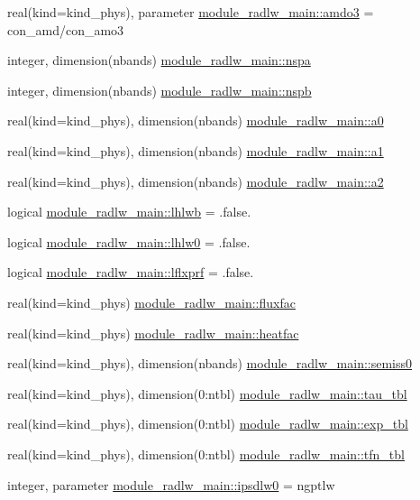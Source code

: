 \begin{DoxyCompactItemize}
\item 
real(kind=kind\+\_\+phys), parameter \hyperlink{group__module__radlw__main_ga06f62c34722a3d7dcec9b5643d78f039}{module\+\_\+radlw\+\_\+main\+::amdo3} = con\+\_\+amd/con\+\_\+amo3
\item 
integer, dimension(nbands) \hyperlink{group__module__radlw__main_ga42bbf62b5d91586f17d352af74e3c032}{module\+\_\+radlw\+\_\+main\+::nspa}
\item 
integer, dimension(nbands) \hyperlink{group__module__radlw__main_ga520be8a7f308d9e2c8e88b185170404e}{module\+\_\+radlw\+\_\+main\+::nspb}
\item 
real(kind=kind\+\_\+phys), dimension(nbands) \hyperlink{group__module__radlw__main_gae55000724e738b7a5b7be4c8cef07553}{module\+\_\+radlw\+\_\+main\+::a0}
\item 
real(kind=kind\+\_\+phys), dimension(nbands) \hyperlink{group__module__radlw__main_gaeba888f00b19a65460f3b587c60ea4a0}{module\+\_\+radlw\+\_\+main\+::a1}
\item 
real(kind=kind\+\_\+phys), dimension(nbands) \hyperlink{group__module__radlw__main_ga1b4681c9bcc9434e30fef0ca4aaa9dcd}{module\+\_\+radlw\+\_\+main\+::a2}
\item 
logical \hyperlink{group__module__radlw__main_ga40b8a6f612a53e0a768cf922aa6f73c3}{module\+\_\+radlw\+\_\+main\+::lhlwb} = .false.
\item 
logical \hyperlink{group__module__radlw__main_ga7f8818436b81efe586d83b2f03b1617f}{module\+\_\+radlw\+\_\+main\+::lhlw0} = .false.
\item 
logical \hyperlink{group__module__radlw__main_gaec461dc1a50b326daa15c57c7dc55602}{module\+\_\+radlw\+\_\+main\+::lflxprf} = .false.
\item 
real(kind=kind\+\_\+phys) \hyperlink{group__module__radlw__main_ga3c31da677e01139d9a3f1e0795a0b614}{module\+\_\+radlw\+\_\+main\+::fluxfac}
\item 
real(kind=kind\+\_\+phys) \hyperlink{group__module__radlw__main_ga75ff8e29e21f0d07684d4a09c744daec}{module\+\_\+radlw\+\_\+main\+::heatfac}
\item 
real(kind=kind\+\_\+phys), dimension(nbands) \hyperlink{group__module__radlw__main_gae3b32aa685e5f07a0003c5e919d22996}{module\+\_\+radlw\+\_\+main\+::semiss0}
\item 
real(kind=kind\+\_\+phys), dimension(0\+:ntbl) \hyperlink{group__module__radlw__main_ga9f73814ee0b1840d8c546ef341645f43}{module\+\_\+radlw\+\_\+main\+::tau\+\_\+tbl}
\item 
real(kind=kind\+\_\+phys), dimension(0\+:ntbl) \hyperlink{group__module__radlw__main_gac2f240a927351a68fc9063321a307891}{module\+\_\+radlw\+\_\+main\+::exp\+\_\+tbl}
\item 
real(kind=kind\+\_\+phys), dimension(0\+:ntbl) \hyperlink{group__module__radlw__main_ga71dcfb3c365280e100e180fd1ce939ad}{module\+\_\+radlw\+\_\+main\+::tfn\+\_\+tbl}
\item 
integer, parameter \hyperlink{group__module__radlw__main_ga9b634a4f7b06ffdd919de69a165edadc}{module\+\_\+radlw\+\_\+main\+::ipsdlw0} = ngptlw
\end{DoxyCompactItemize}


